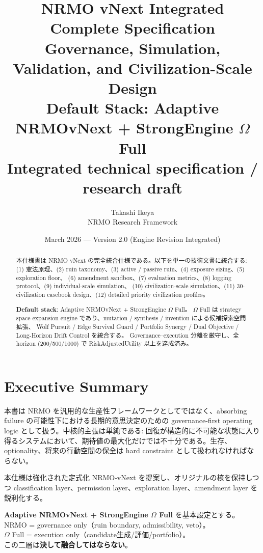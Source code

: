 \documentclass[11pt,a4paper]{article}
\title{\vspace{-1cm}
  {\LARGE\sffamily\bfseries\color{nb}NRMO vNext Integrated Complete Specification}\\[6pt]
  {\Large\sffamily\color{nb!70}Governance, Simulation, Validation, and Civilization-Scale Design}\\[4pt]
  {\large\sffamily\color{np}Default Stack: Adaptive NRMOvNext + StrongEngine $\Omega$ Full}\\[6pt]
  {\normalsize\sffamily\color{ngr}Integrated technical specification / research draft}}
\author{\sffamily Takashi Ikeya\\[2pt]\small\sffamily\color{ngr}NRMO Research Framework}
\date{\sffamily March 2026 — Version 2.0 (Engine Revision Integrated)}
\theoremstyle{definition}\newtheorem{definition}{Definition}[section]
\begin{document}
\maketitle\thispagestyle{fancy}

\begin{abstract}\noindent
本仕様書は NRMO vNext の完全統合仕様である。以下を単一の技術文書に統合する:
(1) 憲法原理、(2) ruin taxonomy、(3) active / passive ruin、(4) exposure sizing、(5) exploration floor、
(6) amendment sandbox、(7) evaluation metrics、(8) logging protocol、(9) individual-scale simulation、
(10) civilization-scale simulation、(11) 30-civilization casebook design、(12) detailed priority civilization profiles。

\textbf{Default stack}: Adaptive NRMOvNext + StrongEngine $\Omega$ Full。
$\Omega$ Full は strategy space expansion engine であり、mutation / synthesis / invention による候補探索空間拡張、
Wolf Pursuit / Edge Survival Guard / Portfolio Synergy / Dual Objective / Long-Horizon Drift Control を統合する。
Governance--execution 分離を厳守し、全 horizon (200/500/1000) で RiskAdjustedUtility 以上を達成済み。
\end{abstract}

\tableofcontents\newpage

\section{Executive Summary}

本書は NRMO を汎用的な生産性フレームワークとしてではなく、absorbing failure の可能性下における長期的意思決定のための governance-first operating logic として扱う。中核的主張は単純である: 回復が構造的に不可能な状態に入り得るシステムにおいて、期待値の最大化だけでは不十分である。生存、optionality、将来の行動空間の保全は hard constraint として扱われなければならない。

本仕様は強化された定式化 NRMO-vNext を提案し、オリジナルの核を保持しつつ classification layer、permission layer、exploration layer、amendment layer を鋭利化する。

\begin{principle}
\textbf{Adaptive NRMOvNext + StrongEngine $\Omega$ Full} を基本設定とする。\\
NRMO = governance only（ruin boundary, admissibility, veto）。\\
$\Omega$ Full = execution only（candidate生成/評価/portfolio）。\\
この二層は\textbf{決して融合してはならない}。
\end{principle}
\end{document}

